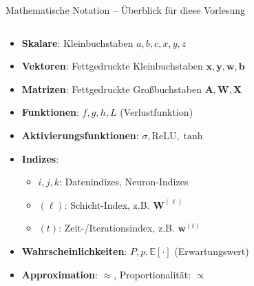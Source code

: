 \documentclass[aspectratio=1610, xcolor=dvipsnames, 9pt]{beamer}
\begin{document}
\begin{frame}{Mathematische Notation -- Überblick für diese Vorlesung}
  \begin{columns}
    \begin{column}{1\textwidth}
      \begin{itemize}
        \item \textbf{Skalare}: Kleinbuchstaben $a, b, c, x, y, z$
        \item \textbf{Vektoren}: Fettgedruckte Kleinbuchstaben $\mathbf{x}, \mathbf{y}, \mathbf{w}, \mathbf{b}$
        \item \textbf{Matrizen}: Fettgedruckte Großbuchstaben $\mathbf{A}, \mathbf{W}, \mathbf{X}$
        \item \textbf{Funktionen}: $f, g, h, L$ (Verlustfunktion)
        \item \textbf{Aktivierungsfunktionen}: $\sigma, \text{ReLU}, \tanh$
        \item \textbf{Indizes}:
        \begin{itemize}
          \item $i, j, k$: Datenindizes, Neuron-Indizes
          \item $(\ell)$: Schicht-Index, z.B. $\mathbf{W}^{(\ell)}$
          \item $(t)$: Zeit-/Iterationsindex, z.B. $\mathbf{w}^{(t)}$
        \end{itemize}
        \item \textbf{Wahrscheinlichkeiten}: $P, p, \mathbb{E}[\cdot]$ (Erwartungswert)
        \item \textbf{Approximation}: $\approx$, Proportionalität: $\propto$
      \end{itemize}
    \end{column}
  \end{columns}
\end{frame}
\end{document}
